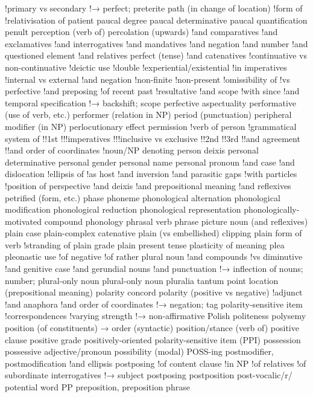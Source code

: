 !primary vs secondary
!→ perfect; preterite
path (in change of location)
!form of
!relativisation of
patient
paucal degree
paucal determinative
paucal quantification
penult
perception (verb of)
percolation (upwards)
!and comparatives
!and exclamatives
!and interrogatives
!and mandatives
!and negation
!and number
!and questioned element
!and relatives
perfect (tense)
!and catenatives
!continuative vs non-continuative
!deictic use
!double
!experiential/existential
!in imperatives
!internal vs external
!and negation
!non-finite
!non-present
!omissibility of
!vs perfective
!and preposing
!of recent past
!resultative
!and scope
!with since
!and temporal specification
!→ backshift; scope
perfective aspectuality
performative (use of verb, etc.)
performer (relation in NP)
period (punctuation)
peripheral modifier (in NP)
perlocutionary effect
permission
!verb of
person
!grammatical system of
!!1st
!!!imperatives
!!!inclusive vs exclusive
!!2nd
!!3rd
!!and agreement
!!and order of coordinates
!noun/NP denoting
person deixis
personal determinative
personal gender
personal name
personal pronoun
!and case
!and dislocation
!ellipsis of
!as host
!and inversion
!and parasitic gaps
!with particles
!position of
perspective
!and deixis
!and prepositional meaning
!and reflexives
petrified (form, etc.)
phase
phoneme
phonological alternation
phonological modification
phonological reduction
phonological representation
phonologically-motivated compound
phonology
phrasal verb
phrase
picture noun (and reflexives)
plain case
plain-complex catenative
plain (vs embellished) clipping
plain form of verb
!stranding of
plain grade
plain present tense
plasticity of meaning
plea
pleonastic use
!of negative
!of rather
plural noun
!and compounds
!vs diminutive
!and genitive case
!and gerundial nouns
!and punctuation
!→ inflection of nouns; number; plural-only noun
plural-only noun
pluralia tantum
point location (prepositional meaning)
polarity concord
polarity (positive vs negative)
!adjunct
!and anaphora
!and order of coordinates
!→ negation; tag
polarity-sensitive item
!correspondences
!varying strength
!→ non-affirmative
Polish
politeness
polysemy
position (of constituents) → order (syntactic)
position/stance (verb of)
positive clause
positive grade
positively-oriented polarity-sensitive item (PPI)
possession
possessive adjective/pronoun
possibility (modal)
POSS-ing
postmodifier, postmodification
!and ellipsis
postposing
!of content clause
!in NP
!of relatives
!of subordinate interrogatives
!→ subject postposing
postposition
post-vocalic/r/
potential word
PP preposition, preposition phrase
